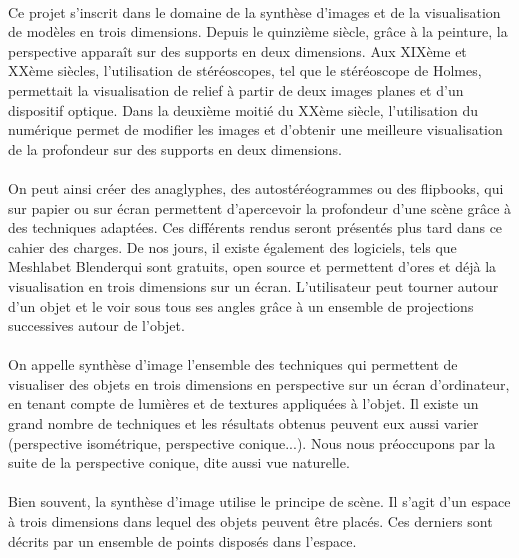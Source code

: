 \paragraph{}
	Ce projet s’inscrit dans le domaine de la synthèse d’images et de la visualisation de modèles en trois dimensions. Depuis le quinzième siècle, grâce à la peinture, la perspective apparaît sur des supports en deux dimensions\cite{wiki3D}. Aux XIXème et XXème siècles, l’utilisation de stéréoscopes\cite{stereoscope}, tel que le stéréoscope de Holmes, permettait la visualisation de relief à partir de deux images planes et d’un dispositif optique. Dans la deuxième moitié du XXème siècle, l’utilisation du numérique permet de modifier les images et d’obtenir une meilleure visualisation de la profondeur sur des supports en deux dimensions. 

\paragraph{}	
	On peut ainsi créer des anaglyphes, des autostéréogrammes ou des flipbooks, qui sur papier ou sur écran permettent d’apercevoir la profondeur d’une scène grâce à des techniques adaptées. Ces différents rendus seront présentés plus tard dans ce cahier des charges. De nos jours, il existe également des logiciels, tels que Meshlab\footnotemark {}et Blender\footnotemark qui sont gratuits, open source et permettent d’ores et déjà la visualisation en trois dimensions sur un écran. L’utilisateur peut tourner autour d’un objet et le voir sous tous ses angles grâce à un ensemble de projections successives autour de l’objet.



\paragraph{}
	On appelle synthèse d’image l'ensemble des techniques qui permettent de visualiser des objets en trois dimensions en perspective sur un écran d'ordinateur, en tenant compte de lumières et de textures appliquées à l'objet. Il existe un grand nombre de techniques et les résultats obtenus peuvent eux aussi varier (perspective isométrique, perspective conique...). Nous nous préoccupons par la suite de la perspective conique, dite aussi vue naturelle. 

\paragraph{}
	Bien souvent, la synthèse d'image utilise le principe de scène. Il s'agit d'un espace à trois dimensions dans lequel des objets peuvent être placés. Ces derniers sont décrits par un ensemble de points disposés dans l'espace.

